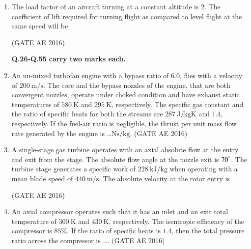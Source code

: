 \documentclass[journal,12pt,onecolumn]{IEEEtran}
\theoremstyle{remark}
\begin{document}
\begin{enumerate}
\item The load factor of an aircraft turning at a constant altitude is 2. The coefficient of lift required for turning flight as compared to level flight at the same speed will be
\begin{enumerate}
\end{enumerate}
\hfill(GATE AE 2016)



\textbf{Q.26-Q.55 carry two marks each.}
\item An un-mixed turbofan engine with a bypass ratio of 6.0, flies with a velocity of $200~\mathrm{m/s}$. The core and the bypass nozzles of the engine, that are both convergent nozzles, operate under choked condition and have exhaust static temperatures of $580~\mathrm{K}$ and $295~\mathrm{K}$, respectively. The specific gas constant and the ratio of specific heats for both the streams are $287~\mathrm{J/kgK}$ and $1.4$, respectively. If the fuel-air ratio is negligible, the thrust per unit mass flow rate generated by the engine is \dots $\mathrm{Ns/kg}$.
\hfill(GATE AE 2016)



\item A single-stage gas turbine operates with an axial absolute flow at the entry and exit from the stage. The absolute flow angle at the nozzle exit is $70^{\degree}$. The turbine stage generates a specific work of $228~\mathrm{kJ/kg}$ when operating with a mean blade speed of $440~\mathrm{m/s}$. The absolute velocity at the rotor entry is
\begin{enumerate}
\end{enumerate}
\hfill(GATE AE 2016)



\item An axial compressor operates such that it has an inlet and an exit total temperature of $300~\mathrm{K}$ and $430~\mathrm{K}$, respectively. The isentropic efficiency of the compressor is $85\%$. If the ratio of specific heats is $1.4$, then the total pressure ratio across the compressor is \dots.
\hfill(GATE AE 2016)




\end{enumerate}
\end{document}
